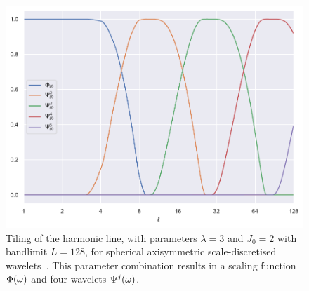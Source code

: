 \begin{figure}[htpb]
\centering\capstart{}
\includegraphics[width=\textwidth]{axisymmetric_tiling_L128.pdf}
\caption[
Tiling of the harmonic line used in scale-discretised wavelets
]{
Tiling of the harmonic line, with parameters \(\lambda=3\) and \(J_{0}=2\) with bandlimit \(L=128\), for spherical axisymmetric scale-discretised wavelets~\cite{Wiaux2008,McEwen2018,Leistedt2013,McEwen2013,McEwen2015}.
This parameter combination results in a scaling function \(\Phi(\omega)\) and four wavelets \(\Psi^{j}(\omega)\).
}\label{fig:chapter2_tiling}
\end{figure}
